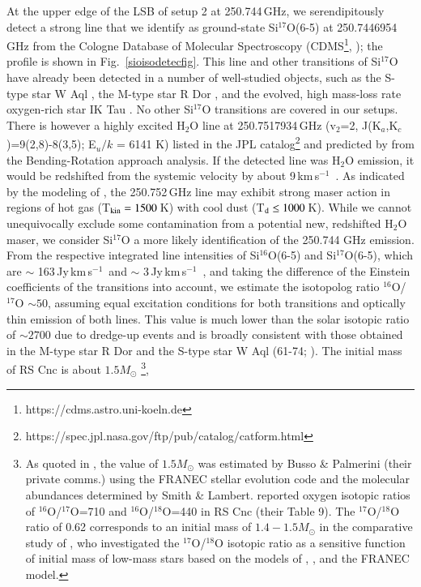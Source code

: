 \documentclass{aa}
\newcommand{\kms}{\,km\,s$^{-1}$~}
\begin{document}
At the upper edge of the LSB of setup 2 at 250.744\,GHz, we
serendipitously detect a strong line that we identify as ground-state
Si$^{17}$O(6-5) at 250.7446954 GHz \citep{siocdms2013} from the
Cologne Database of Molecular Spectroscopy
(CDMS\footnote{https://cdms.astro.uni-koeln.de}, \citet{cdms2005});
the profile is shown in Fig.~\ref{sioisodetecfig}. This line and other
transitions of Si$^{17}$O have already been detected in a number of
well-studied objects, such as the S-type star W Aql \citep{do2020},
the M-type star R Dor \citep{do2018}, and the evolved, high mass-loss
rate oxygen-rich star IK Tau \citep{vsc2017}. No other Si$^{17}$O
transitions are covered in our setups. There is however a highly
excited H$_2$O line at 250.7517934\,GHz (v$_2$=2,
J(K$_a$,K$_c$)=9(2,8)-8(3,5); E$_u/k$ = 6141 K) listed in the JPL
catalog\footnote{https://spec.jpl.nasa.gov/ftp/pub/catalog/catform.html}
and predicted by \citet{yuetal2012} from the Bending-Rotation approach
analysis. If the detected line was H$_2$O emission, it would be
redshifted from the systemic velocity by about 9\kms. As indicated by
the modeling of \citet{gmretal2016}, the 250.752\,GHz line may exhibit
strong maser action in regions of hot gas (T$_{\rm kin} = 1500$\,K)
with cool dust  (T$_{\rm d} \leq 1000$\,K). While we cannot
unequivocally exclude some contamination from a potential new,
redshifted H$_2$O maser, we consider Si$^{17}$O a more likely
identification of the 250.744 GHz emission. From the respective
integrated line intensities of Si$^{16}$O(6-5) and Si$^{17}$O(6-5),
which are $\sim$ 163\,Jy\kms and $\sim$ 3\,Jy\kms, and taking the
difference of the Einstein coefficients of the transitions into
account, we estimate the isotopolog ratio $^{16}$O/$^{17}$O $\sim
50$, assuming equal excitation conditions for both transitions and
optically thin emission of both lines. This value is much lower than
the solar isotopic ratio of $\sim2700$ \citep{lpg2009} due to
dredge-up events \citep{kl2014,hls2016} and is broadly consistent with
those obtained in the M-type star R Dor and the S-type star W Aql
(61-74; \citet{do2018,do2020}). The initial mass of RS Cnc is about
$1.5M_{\odot}$ \citep{lwlgm2010}\footnote{As quoted in
\citet{lwlgm2010}, the value of $1.5 M_\odot$ was estimated by Busso
\& Palmerini (their private comms.)  using the FRANEC stellar
evolution code \citep{2011ApJS..197...17C} and the molecular
abundances determined by Smith \& Lambert. \citet{1990ApJS...72..387S}
reported oxygen isotopic ratios of $^{16}$O/$^{17}$O=710 and
$^{16}$O/$^{18}$O=440 in RS Cnc (their Table 9).  The
$^{17}$O/$^{18}$O ratio of 0.62 corresponds to an initial mass of
$1.4-1.5 M_\odot$ in the comparative study of \citet{denutteetal2017},
who investigated the $^{17}$O/$^{18}$O isotopic ratio as a sensitive
function of initial mass of low-mass stars based on the models of
\citet{2004MNRAS.352..984S}, \citet{kl2014}, and the FRANEC model.},
\end{document}
